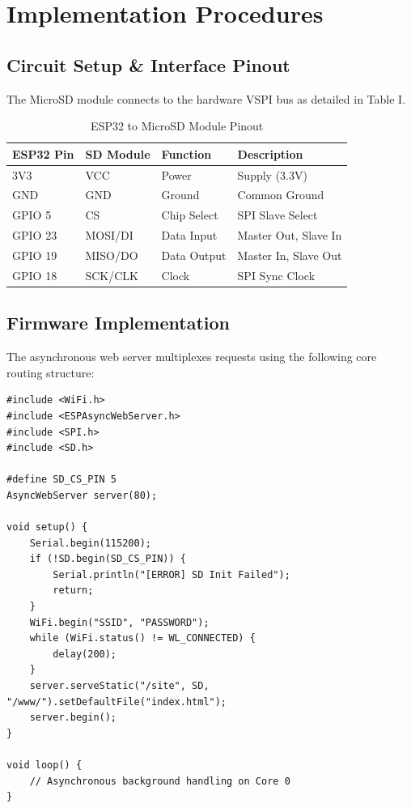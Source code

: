 \documentclass[conference]{IEEEtran}
\begin{document}
\section{Implementation Procedures}

\subsection{Circuit Setup \& Interface Pinout}
The MicroSD module connects to the hardware VSPI bus as detailed in Table I.

\begin{table}[htbp]
\caption{ESP32 to MicroSD Module Pinout}
\begin{center}
\begin{tabular}{llll}
\toprule
\textbf{ESP32 Pin} & \textbf{SD Module} & \textbf{Function} & \textbf{Description} \\
\midrule
3V3 & VCC & Power & Supply (3.3V) \\
GND & GND & Ground & Common Ground \\
GPIO 5 & CS & Chip Select & SPI Slave Select \\
GPIO 23 & MOSI/DI & Data Input & Master Out, Slave In \\
GPIO 19 & MISO/DO & Data Output & Master In, Slave Out \\
GPIO 18 & SCK/CLK & Clock & SPI Sync Clock \\
\bottomrule
\end{tabular}
\label{tab:pinout}
\end{center}
\end{table}

\subsection{Firmware Implementation}
The asynchronous web server multiplexes requests using the following core routing structure:

\begin{lstlisting}
#include <WiFi.h>
#include <ESPAsyncWebServer.h>
#include <SPI.h>
#include <SD.h>

#define SD_CS_PIN 5
AsyncWebServer server(80);

void setup() {
    Serial.begin(115200);
    if (!SD.begin(SD_CS_PIN)) {
        Serial.println("[ERROR] SD Init Failed");
        return;
    }
    WiFi.begin("SSID", "PASSWORD");
    while (WiFi.status() != WL_CONNECTED) {
        delay(200);
    }
    server.serveStatic("/site", SD, "/www/").setDefaultFile("index.html");
    server.begin();
}

void loop() {
    // Asynchronous background handling on Core 0
}
\end{lstlisting}
\end{document}
